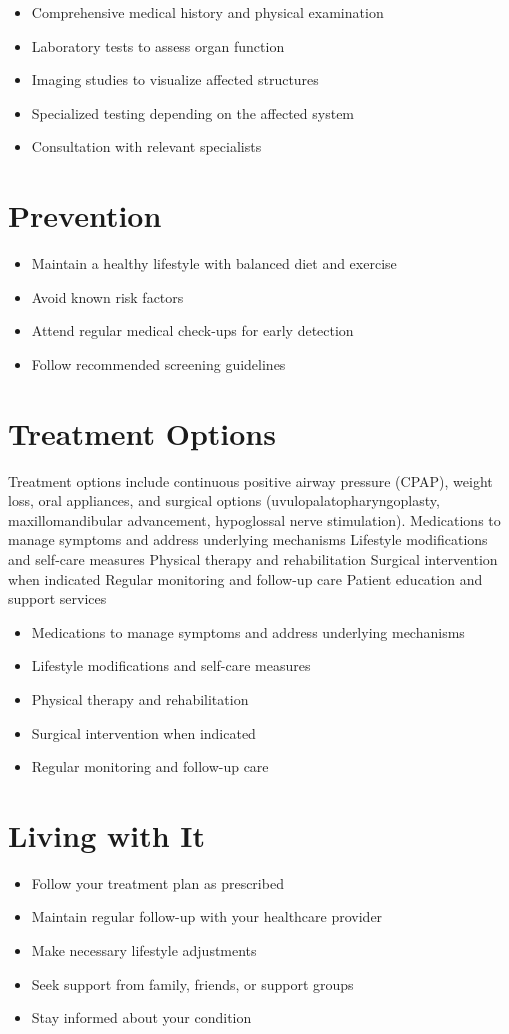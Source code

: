 \begin{itemize}[noitemsep]
  \item Comprehensive medical history and physical examination
  \item Laboratory tests to assess organ function
  \item Imaging studies to visualize affected structures
  \item Specialized testing depending on the affected system
  \item Consultation with relevant specialists
\end{itemize}
\section{Prevention}
\begin{itemize}[noitemsep]
  \item Maintain a healthy lifestyle with balanced diet and exercise
  \item Avoid known risk factors
  \item Attend regular medical check-ups for early detection
  \item Follow recommended screening guidelines
\end{itemize}
\section{Treatment Options}
Treatment options include continuous positive airway pressure (CPAP), weight loss, oral appliances, and surgical options (uvulopalatopharyngoplasty, maxillomandibular advancement, hypoglossal nerve stimulation). Medications to manage symptoms and address underlying mechanisms Lifestyle modifications and self-care measures Physical therapy and rehabilitation Surgical intervention when indicated Regular monitoring and follow-up care Patient education and support services

\begin{itemize}[noitemsep]
  \item Medications to manage symptoms and address underlying mechanisms
  \item Lifestyle modifications and self-care measures
  \item Physical therapy and rehabilitation
  \item Surgical intervention when indicated
  \item Regular monitoring and follow-up care
\end{itemize}
\section{Living with It}
\begin{itemize}[noitemsep]
  \item Follow your treatment plan as prescribed
  \item Maintain regular follow-up with your healthcare provider
  \item Make necessary lifestyle adjustments
  \item Seek support from family, friends, or support groups
  \item Stay informed about your condition
\end{itemize}
